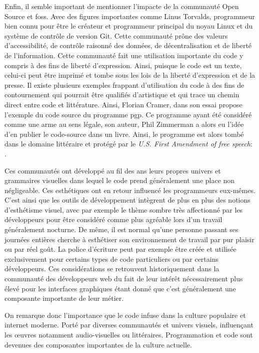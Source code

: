 \documentclass[12pt]{article} %
\begin{document}
Enfin, il semble important de mentionner l'impacte de la communauté Open Source et \acrshort{foss}. Avec des figures importantes comme Linus Torvalds, programmeur bien connu pour être le créateur et programmeur principal du noyau Linux et du système de contrôle de version Git. Cette communauté prône des valeurs d'accessibilité, de contrôle raisonné des données, de décentralisation et de liberté de l'information. Cette communauté fait une utilisation importante du code y compris à des fins de liberté d'expression. Ainsi, puisque le code est un texte, celui-ci peut être imprimé et tombe sous les lois de la liberté d'expression et de la presse. Il existe plusieurs exemples frappant d'utilisation du code à des fins de contournement qui pourrait être qualifiés d'artistique et qui trace un chemin direct entre code et littérature. Ainsi, Florian Cramer, dans son essai  propose l'exemple du code source du programme \acrshort{pgp}. Ce programme ayant été considéré comme une arme au sens légale, son auteur, Phil Zimmerman a alors eu l'idée d'en publier le code-source dans un livre. Ainsi, le programme est alors tombé dans le domaine littéraire et protégé par le \textit{\foreignlanguage{english}{U.S. First Amendment of free speech}}:  \cite{FCramer2001}.

Ces communautés ont développé au fil des ans leurs propres univers et grammaires visuelles dans lequel le code prend généralement une place non négligeable. Ces esthétiques ont en retour influencé les programmeurs eux-mêmes. C'est ainsi que les outils de développement intègrent de plus en plus des notions d'esthétisme visuel, avec par exemple le thème sombre très affectionné par les développeurs pour être considéré comme plus agréable lors d'un travail généralement nocturne. De même, il est normal qu'une personne passant ses journées entières cherche à esthétiser son environnement de travail par pur plaisir ou par réel goût. La police d'écriture peut par exemple être créée et utilisée exclusivement pour certains types de code particuliers ou par certains développeurs. Ces considérations se retrouvent historiquement dans la communauté des développeurs web du fait de leur intérêt nécessairement plus élevé pour les interfaces graphiques étant donné que c'est généralement une composante importante de leur métier. 

On remarque donc l'importance que le code infuse dans la culture populaire et internet moderne. Porté par diverses communautés et univers visuels, influençant les œuvres notamment audio-visuelles ou littéraires. Programmation et code sont devenues des composantes importantes de la culture actuelle.  
\end{document}
